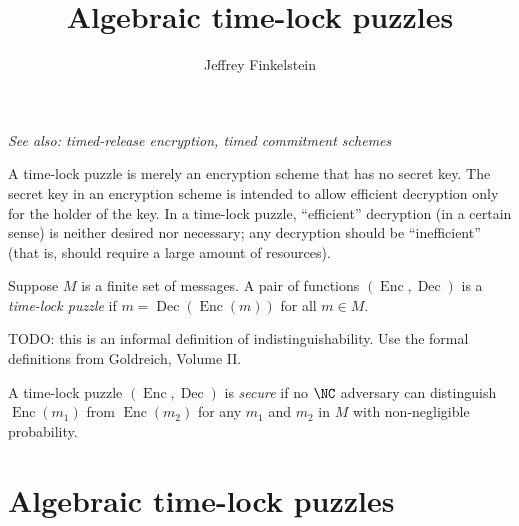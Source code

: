 \documentclass{article}
\title{Algebraic time-lock puzzles}
\author{Jeffrey Finkelstein}
\newcommand{\Enc}{\operatorname{Enc}}
\newcommand{\Dec}{\operatorname{Dec}}
\begin{document}
\maketitle



\emph{See also: timed-release encryption, timed commitment schemes}

A time-lock puzzle is merely an encryption scheme that has no secret key.
The secret key in an encryption scheme is intended to allow efficient decryption only for the holder of the key.
In a time-lock puzzle, ``efficient'' decryption (in a certain sense) is neither desired nor necessary; any decryption should be ``inefficient'' (that is, should require a large amount of resources).

\begin{definition}
  Suppose $M$ is a finite set of messages.
  A pair of functions $(\Enc, \Dec)$ is a \emph{time-lock puzzle} if $m = \Dec(\Enc(m))$ for all $m \in M$.
\end{definition}

\begin{definition}
  TODO: this is an informal definition of indistinguishability.
  Use the formal definitions from Goldreich, Volume II.

  A time-lock puzzle $(\Enc, \Dec)$ is \emph{secure} if no $\NC$ adversary can distinguish $\Enc(m_1)$ from $\Enc(m_2)$ for any $m_1$ and $m_2$ in $M$ with non-negligible probability.
\end{definition}

\section{Algebraic time-lock puzzles}
\end{document}
